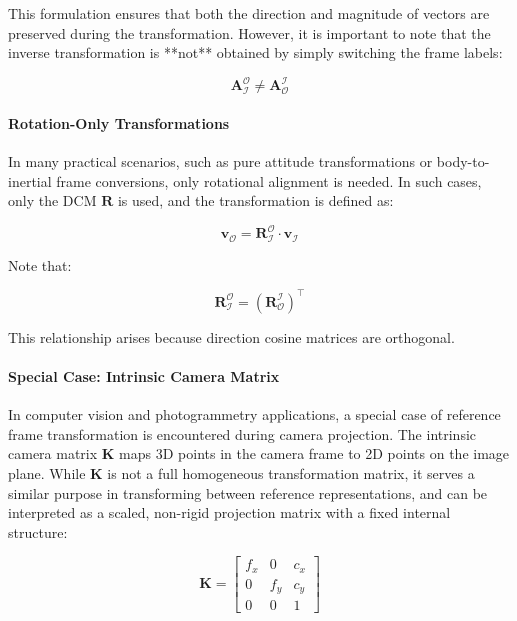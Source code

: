 This formulation ensures that both the direction and magnitude of vectors are preserved during the transformation. However, it is important to note 
that the inverse transformation is **not** obtained by simply switching the frame labels:

\begin{equation}
    \mathbf{A}_\mathcal{I}^\mathcal{O} \ne \mathbf{A}_\mathcal{O}^\mathcal{I}
\end{equation}

\paragraph{Rotation-Only Transformations}

In many practical scenarios, such as pure attitude transformations or body-to-inertial frame conversions, only rotational 
alignment is needed. In such cases, only the DCM $\mathbf{R}$ is used, and the transformation is defined as:

\begin{equation}
    \mathbf{v}_\mathcal{O} = \mathbf{R}_\mathcal{I}^\mathcal{O} \cdot \mathbf{v}_\mathcal{I}
\end{equation}

Note that:

\begin{equation}
    \mathbf{R}_\mathcal{I}^\mathcal{O} = \left( \mathbf{R}_\mathcal{O}^\mathcal{I} \right)^\top
\end{equation}

This relationship arises because direction cosine matrices are orthogonal.

\paragraph{Special Case: Intrinsic Camera Matrix}

In computer vision and photogrammetry applications, a special case of reference frame transformation is encountered during 
camera projection. The intrinsic camera matrix $\mathbf{K}$ maps 3D points in the camera frame to 2D points on the image plane. While $\mathbf{K}$ is not 
a full homogeneous transformation matrix, it serves a similar purpose in transforming between reference representations, and can be interpreted as a scaled, 
non-rigid projection matrix with a fixed internal structure:

\begin{equation}
    \mathbf{K} =
    \begin{bmatrix}
        f_x & 0 & c_x \\
        0 & f_y & c_y \\
        0 & 0 & 1
    \end{bmatrix}
\end{equation}

